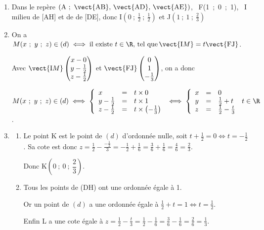 \begin{enumerate}
\item 
Dans le repère $\left(\text{A}~;~\vect{\text{AB}},\,\vect{\text{AD}},\, \vect{\text{AE}}\right)$, \, F(1~;~0~;~1), \, I milieu de [AH] et de de [DE], donc I$\left(0~;~\frac{1}{2}~;~\frac{1}{2}\right)$ et J$\left(1~;~1~;~\frac{2}{3}\right)$

\item 
On a $M(x~;~y~;~z) \in (d) \iff \text{il existe } t \in \R,\, \text{tel que}\, \vect{\text{I}M} = t\vect{\text{FJ}}$.

Avec $\vect{\text{I}M}\begin{pmatrix}x - 0\\y - \frac{1}{2}\\z - \frac{1}{2}\end{pmatrix}$ et 
$\vect{\text{FJ}}\begin{pmatrix}0\\1\\-\frac{1}{3}\end{pmatrix}$, on a donc 

$M(x~;~y~;~z) \in (d) \iff \left\{\begin{array}{l c l}
x&=&t \times 0\\
y - \frac{1}{2}&=&t \times 1\\
z - \frac{1}{2}&=&t \times \left( -\frac{1}{3}\right)
\end{array}\right. \iff \left\{\begin{array}{l c l}
x&=&0\\
y &=&\frac{1}{2} + t \\
z &=&\frac{1}{2} -\frac{t}{3}
\end{array}\right.\, t \in \R$.
\item 
	\begin{enumerate}
		\item 
Le point K est le point de $(d)$ d'ordonnée nulle, soit $t + \frac{1}{2} = 0 \iff t = - \frac{1}{2}$. Sa cote est donc $z = \frac{1}{2} - \frac{- \frac{1}{2}}{3} = - \frac{1}{2} + \frac{1}{6} = \frac{3}{6} + \frac{1}{6} = \frac{4}{6} = \frac{2}{3}$.
		
Donc K$\left(0~;~ 0~;~\dfrac{2}{3}\right)$.
		\item 
		Tous les points de (DH) ont une ordonnée égale à 1.

Or un point de $(d)$ a une ordonnée égale à $\frac{1}{2} + t = 1 \iff t = \frac{1}{2} $.

Enfin L a une cote égale à $z = \frac{1}{2} - \frac{t}{3} = \frac{1}{2} - \frac{1}{6}  = \frac{3}{6} - \frac{1}{6} = \frac{2}{6} = \frac{1}{3}$.


\end{enumerate}
\end{enumerate}
